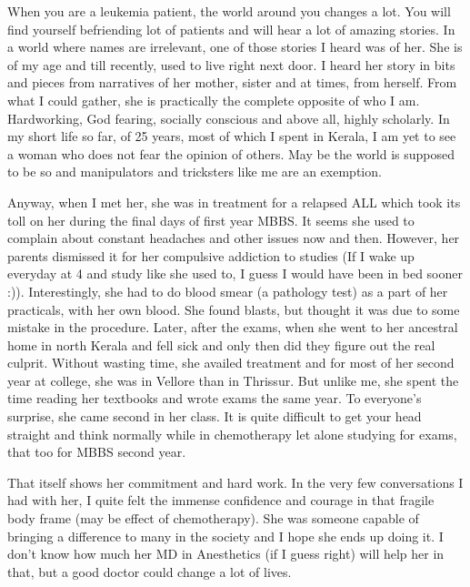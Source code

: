 \vskip 2pt

When you are a leukemia patient, the world around you changes a lot. You will find yourself befriending lot of patients and will hear a lot of amazing stories. In a world where names are irrelevant, one of those stories I heard was of her. She is of my age and till recently, used to live right next door. I heard her story in bits and pieces from narratives of her mother, sister and at times, from herself. From what I could gather, she is practically the complete opposite of who I am. Hardworking, God fearing, socially conscious and above all, highly scholarly. In my short life so far, of 25 years, most of which I spent in Kerala, I am yet to see a woman who does not fear the opinion of others. May be the world is supposed to be so and manipulators and tricksters like me are an exemption.

Anyway, when I met her, she was in treatment for a relapsed ALL which took its toll on her during the final days of first year MBBS. It seems she used to complain about constant headaches and other issues now and then. However, her parents dismissed it for her compulsive addiction to studies (If I wake up everyday at 4 and study like she used to, I guess I would have been in bed sooner :)). Interestingly, she had to do blood smear (a pathology test) as a part of her practicals, with her own blood. She found blasts, but thought it was due to some mistake in the procedure. Later, after the exams, when she went to her ancestral home in north Kerala and fell sick and only then did they figure out the real culprit. Without wasting time, she availed treatment and for most of her second year at college, she was in Vellore than in Thrissur. But unlike me, she spent the time reading her textbooks and wrote exams the same year. To everyone's surprise, she came second in her class. It is quite difficult to get your head straight and think normally while in chemotherapy let alone studying for exams, that too for MBBS second year. 

That itself shows her commitment and hard work. In the very few conversations I had with her, I quite felt the immense confidence and courage in that fragile body frame (may be effect of chemotherapy). She was someone capable of bringing a difference to many in the society and I hope she ends up doing it. I don't know how much her MD in Anesthetics (if I guess right) will help her in that, but a good doctor could change a lot of lives. 

